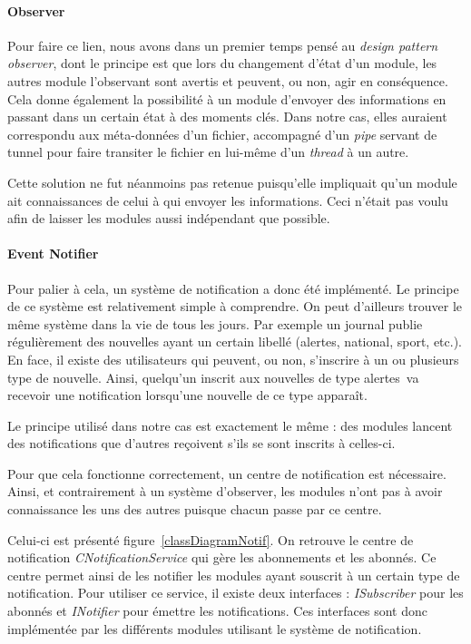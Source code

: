 \documentclass[a4paper,10pt, twoside]{report}
\begin{document}
\begin{spacing}{1.2}
\paragraph{Observer\\}
Pour faire ce lien, nous avons dans un premier temps pens\'e au
\textit{design pattern} \textit{observer}, dont le principe est que lors du
changement d'\'etat d'un module, les autres module l'observant sont avertis et
peuvent, ou non, agir en cons\'equence. Cela donne \'egalement la possibilit\'e
\`a un module d'envoyer des informations en passant dans un certain \'etat \`a
des moments cl\'es. Dans notre cas, elles auraient correspondu aux
m\'eta-donn\'ees d'un fichier, accompagn\'e d'un \textit{pipe} servant de
tunnel pour faire transiter le fichier en lui-m\^eme d'un \textit{thread} \`a
un autre.

Cette solution ne fut n\'eanmoins pas retenue puisqu'elle impliquait qu'un
module ait connaissances de celui \`a qui envoyer les informations. Ceci
n'\'etait pas voulu afin de laisser les modules aussi ind\'ependant que
possible.

\paragraph{Event Notifier\\}
Pour palier \`a cela, un syst\`eme de notification a donc \'et\'e
impl\'ement\'e. Le principe de ce syst\`eme est relativement simple \`a
comprendre. On peut d'ailleurs trouver le m\^eme syst\`eme dans la vie de
tous les jours. Par exemple un journal publie r\'eguli\`erement des nouvelles
ayant un certain libell\'e (\flqq alertes\frqq, \flqq national\frqq, \flqq
sport\frqq, etc.). En face, il existe des utilisateurs qui peuvent, ou non,
s'inscrire \`a un ou plusieurs type de nouvelle. Ainsi, quelqu'un inscrit aux
nouvelles de type \flqq alertes\frqq~va recevoir une notification lorsqu'une
nouvelle de ce type appara\^it.

Le principe utilis\'e dans notre cas est exactement le m\^eme : des modules
lancent des notifications que d'autres re\c{c}oivent s'ils se sont inscrits \`a
celles-ci.

Pour que cela fonctionne correctement, un centre de notification est
n\'ecessaire. Ainsi, et contrairement \`a un syst\`eme d'\flqq observer\frqq,
les modules n'ont pas \`a avoir connaissance les uns des autres puisque chacun
passe par ce centre.

Celui-ci est pr\'esent\'e figure~\ref{classDiagramNotif}. On retrouve le
centre de notification \textit{CNotificationService} qui g\`ere les
abonnements et les abonn\'es. Ce centre permet ainsi de les notifier les modules
ayant souscrit \`a un certain type de notification. Pour utiliser ce service,
il existe deux interfaces : \textit{ISubscriber} pour les abonn\'es et
\textit{INotifier} pour \'emettre les notifications. Ces interfaces sont donc
impl\'ement\'ee par les diff\'erents modules utilisant le syst\`eme de
notification.


\end{spacing}
\end{document}
